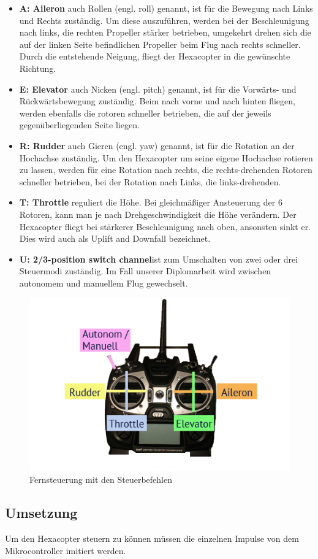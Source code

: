       \begin{itemize}
        \item \textbf{A: Aileron} auch Rollen (engl. roll) genannt, ist für die Bewegung nach Links und Rechts zuständig.
        Um diese auszuführen, werden bei der Beschleunigung nach links, die rechten Propeller stärker betrieben, umgekehrt drehen sich die auf der linken Seite befindlichen Propeller beim Flug nach rechts schneller. Durch die entstehende Neigung, fliegt der Hexacopter in die gewünschte Richtung.
        \item \textbf{E: Elevator} auch Nicken (engl. pitch) genannt, ist für die Vorwärts- und Rückwärtsbewegung zuständig.
        Beim nach vorne und nach hinten fliegen, werden ebenfalls die rotoren schneller betrieben, die auf der jeweils gegenüberliegenden Seite liegen.
        \item \textbf{R: Rudder} auch Gieren (engl. yaw) genannt, ist für die Rotation an der Hochachse zuständig.
        Um den Hexacopter um seine eigene Hochachse rotieren zu lassen, werden für eine Rotation nach rechts, die rechts-drehenden Rotoren schneller betrieben, bei der Rotation nach Links, die links-drehenden.
        \item \textbf{T: Throttle} reguliert die Höhe.
        Bei gleichmäßiger Ansteuerung der 6 Rotoren, kann man je nach Drehgeschwindigkeit die Höhe verändern. Der Hexacopter fliegt bei stärkerer Beschleunigung nach oben, ansonsten sinkt er. Dies wird auch als Uplift and Downfall bezeichnet.
        \item \textbf{U: 2/3-position switch channel}\cite{positionswitch}ist zum Umschalten von zwei oder drei Steuermodi zuständig. Im Fall unserer Diplomarbeit wird zwischen autonomem und manuellem Flug gewechselt. 
      \end{itemize}

    \begin{figure}[H]
      \begin{centering}
        \includegraphics[width = \textwidth]{Bilder/bor_fernbedienung}
      \par\end{centering}
      \caption{Fernsteuerung mit den Steuerbefehlen}
      \label{Fernsteuerung}
    \end{figure}

  \subsection{Umsetzung}
  Um den Hexacopter steuern zu können müssen die einzelnen Impulse von dem Mikrocontroller imitiert werden.
